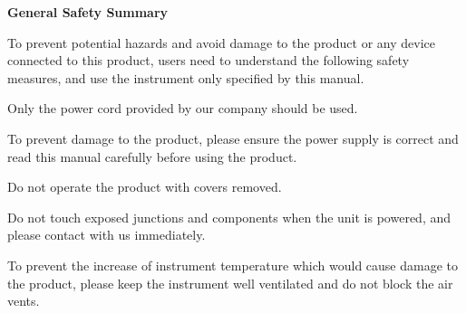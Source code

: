 \noindent\xiaosan\textbf{General Safety Summary}
\vspace{0.7cm}

\hspace{-0.4cm}To prevent potential hazards and avoid damage to the product or any device connected to this product, users need to understand the following safety measures, and use the instrument only specified by this manual.

\vspace{0.7cm}
\noindent{}

\vspace{0.2cm}
\hspace{-0.2cm}Only the power cord provided by our company should be used.

\vspace{0.7cm}

\vspace{0.2cm}
\hspace{-0.2cm}To prevent damage to the product, please ensure the power supply is correct and read this manual carefully before using the product.

\vspace{0.7cm}

\vspace{0.2cm}
\hspace{-0.2cm}Do not operate the product with covers removed.

\vspace{0.7cm}

\vspace{0.2cm}
\hspace{-0.2cm}Do not touch exposed junctions and components when the unit is powered, and please contact with us immediately.

\vspace{0.7cm}

\vspace{0.2cm}
\hspace{-0.2cm}To prevent the increase of instrument temperature which would cause damage to the product, please keep the instrument well ventilated and do not block the air vents.

